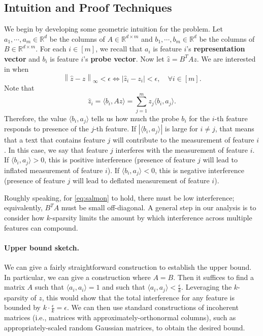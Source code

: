 \documentclass[11pt]{article}
\newcommand{\RR}{\mathbb{R}}
\newcommand{\norm}[1]{\left\|#1\right\|}
\begin{document}
\subsection{Intuition and Proof Techniques}
We begin by developing some geometric intuition for the problem. Let $a_1,\cdots,a_m\in \RR^d$ be the columns of $A\in \RR^{d\times m}$ and $b_1,\cdots,b_m\in \RR^d$ be the columns of $B\in \RR^{d\times m}$. For each $i\in [m]$, we recall that $a_i$ is feature $i$'s \textbf{representation vector} and $b_i$ is feature $i$'s \textbf{probe vector}. Now let $\hat{z} = B^TAz.$ We are interested in when
\begin{equation}\label{eq:salmon}
    \norm{\hat{z}-z}_\infty < \epsilon \iff |\hat{z}_i - z_i| < \epsilon,\quad \forall i\in [m].
\end{equation}
Note that
\begin{equation}
    \hat{z}_i = \langle b_i, Az\rangle = \sum_{j=1}^m z_j \langle b_i, a_j\rangle.
\end{equation}
Therefore, the value $\langle b_i, a_j\rangle$ tells us how much the probe $b_i$ for the $i$-th feature responds to presence of the $j$-th feature. If $|\langle b_i,a_j\rangle|$ is large for $i\neq j$, that means that a text that contains feature $j$ will contribute to the measurement of feature $i$. In this case, we say that feature $j$ interferes with the measurement of feature $i$. If $\langle b_i,a_j \rangle > 0$, this is positive interference (presence of feature $j$ will lead to inflated measurement of feature $i$). If $\langle b_i,a_j \rangle < 0$, this is negative interference (presence of feature $j$ will lead to deflated measurement of feature $i$).

Roughly speaking, for \eqref{eq:salmon} to hold, there must be low interference; equivalently, $B^TA$ must be small off-diagonal. A general step in our analysis is to consider how $k$-sparsity limits the amount by which interference across multiple features can compound.

\paragraph{Upper bound sketch.} We can give a fairly straightforward construction to establish the upper bound. In particular, we can give a construction where $A=B$. Then it suffices to find a matrix $A$ such that $\langle a_i, a_i\rangle = 1$ and such that $\langle a_i, a_j\rangle < \frac{\epsilon}{k}.$ Leveraging the $k$-sparsity of $z$, this would show that the total interference for any feature is bounded by $k \cdot \frac{\epsilon}{k} = \epsilon$. We can then use standard constructions of incoherent matrices (i.e., matrices with approximately-orthonormal columns), such as appropriately-scaled random Gaussian matrices, to obtain the desired bound. 
\end{document}
